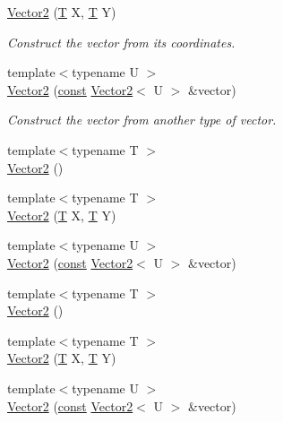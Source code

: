 \begin{DoxyCompactItemize}
\hyperlink{classsf_1_1_vector2_aed26a72164e59e8a4a0aeee2049568f1}{Vector2} (\hyperlink{curses_8priv_8h_a5ef253115820acf7d27f3c5c3b02a0f0}{T} X, \hyperlink{curses_8priv_8h_a5ef253115820acf7d27f3c5c3b02a0f0}{T} Y)
\begin{DoxyCompactList}\small\item\em Construct the vector from its coordinates. \end{DoxyCompactList}\item 
{\footnotesize template$<$typename U $>$ }\\\hyperlink{classsf_1_1_vector2_a3da455e0ae3f8ff6d2fe36d10b332d10}{Vector2} (\hyperlink{term__entry_8h_a57bd63ce7f9a353488880e3de6692d5a}{const} \hyperlink{classsf_1_1_vector2}{Vector2}$<$ U $>$ \&vector)
\begin{DoxyCompactList}\small\item\em Construct the vector from another type of vector. \end{DoxyCompactList}\item 
{\footnotesize template$<$typename T $>$ }\\\hyperlink{classsf_1_1_vector2_a39e5056d930011fba562ad69679efcb8}{Vector2} ()
\item 
{\footnotesize template$<$typename T $>$ }\\\hyperlink{classsf_1_1_vector2_a18a61144d6839c5658b62ebb49c9eb68}{Vector2} (\hyperlink{curses_8priv_8h_a5ef253115820acf7d27f3c5c3b02a0f0}{T} X, \hyperlink{curses_8priv_8h_a5ef253115820acf7d27f3c5c3b02a0f0}{T} Y)
\item 
{\footnotesize template$<$typename U $>$ }\\\hyperlink{classsf_1_1_vector2_a3da455e0ae3f8ff6d2fe36d10b332d10}{Vector2} (\hyperlink{term__entry_8h_a57bd63ce7f9a353488880e3de6692d5a}{const} \hyperlink{classsf_1_1_vector2}{Vector2}$<$ U $>$ \&vector)
\item 
{\footnotesize template$<$typename T $>$ }\\\hyperlink{classsf_1_1_vector2_a39e5056d930011fba562ad69679efcb8}{Vector2} ()
\item 
{\footnotesize template$<$typename T $>$ }\\\hyperlink{classsf_1_1_vector2_a18a61144d6839c5658b62ebb49c9eb68}{Vector2} (\hyperlink{curses_8priv_8h_a5ef253115820acf7d27f3c5c3b02a0f0}{T} X, \hyperlink{curses_8priv_8h_a5ef253115820acf7d27f3c5c3b02a0f0}{T} Y)
\item 
{\footnotesize template$<$typename U $>$ }\\\hyperlink{classsf_1_1_vector2_a3da455e0ae3f8ff6d2fe36d10b332d10}{Vector2} (\hyperlink{term__entry_8h_a57bd63ce7f9a353488880e3de6692d5a}{const} \hyperlink{classsf_1_1_vector2}{Vector2}$<$ U $>$ \&vector)
\end{DoxyCompactItemize}

